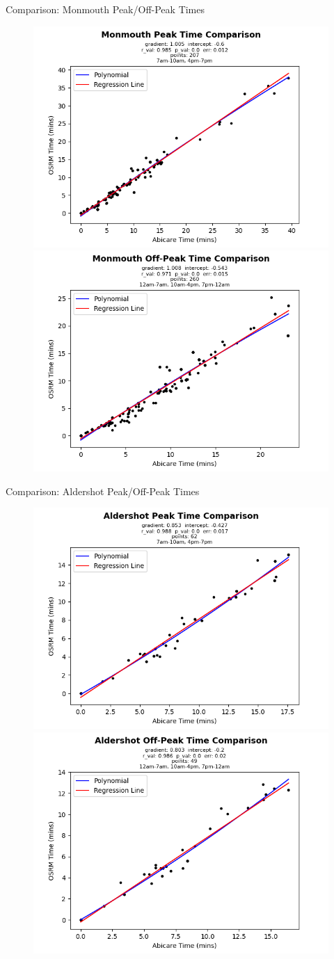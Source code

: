 \documentclass[usenames,dvipsnames]{beamer}
\begin{document}
\begin{frame}{Comparison: Monmouth Peak/Off-Peak Times}
	\begin{figure}
		\includegraphics[width=0.5\linewidth]{figures/Monmouth_peaktime_comparison_abi}%
		\includegraphics[width=0.5\linewidth]{figures/Monmouth_offpeaktime_comparison_abi}
	\end{figure}
\end{frame}

\begin{frame}{Comparison: Aldershot Peak/Off-Peak Times}
	\begin{figure}
		\includegraphics[width=0.5\linewidth]{figures/Aldershot_peaktime_comparison_abi}%
		\includegraphics[width=0.5\linewidth]{figures/Aldershot_offpeaktime_comparison_abi}
	\end{figure}
\end{frame}
\end{document}

